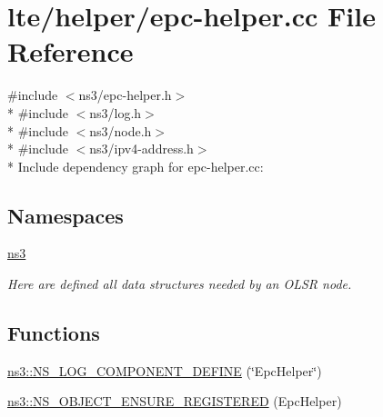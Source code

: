 \hypertarget{epc-helper_8cc}{}\section{lte/helper/epc-\/helper.cc File Reference}
\label{epc-helper_8cc}
{\ttfamily \#include $<$ns3/epc-\/helper.\+h$>$}\\*
{\ttfamily \#include $<$ns3/log.\+h$>$}\\*
{\ttfamily \#include $<$ns3/node.\+h$>$}\\*
{\ttfamily \#include $<$ns3/ipv4-\/address.\+h$>$}\\*
Include dependency graph for epc-\/helper.cc\+:
\subsection*{Namespaces}
\begin{DoxyCompactItemize}
\item 
 \hyperlink{namespacens3}{ns3}
\begin{DoxyCompactList}\small\item\em Here are defined all data structures needed by an O\+L\+SR node. \end{DoxyCompactList}\end{DoxyCompactItemize}
\subsection*{Functions}
\begin{DoxyCompactItemize}
\item 
\hyperlink{namespacens3_a272bb5de87537e732238879c8d425657}{ns3\+::\+N\+S\+\_\+\+L\+O\+G\+\_\+\+C\+O\+M\+P\+O\+N\+E\+N\+T\+\_\+\+D\+E\+F\+I\+NE} (\char`\"{}Epc\+Helper\char`\"{})
\item 
\hyperlink{namespacens3_a92223ae11fbefe92fb0fcf50eabe8ea5}{ns3\+::\+N\+S\+\_\+\+O\+B\+J\+E\+C\+T\+\_\+\+E\+N\+S\+U\+R\+E\+\_\+\+R\+E\+G\+I\+S\+T\+E\+R\+ED} (Epc\+Helper)
\end{DoxyCompactItemize}
